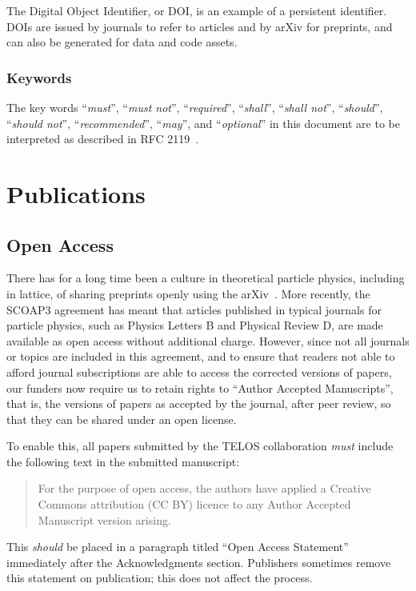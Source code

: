 \documentclass{article}
\newcommand\rfcword[1]{\emph{#1}\xspace}
\newcommand\must{\rfcword{must}}
\newcommand\mustnot{\rfcword{must not}}
\newcommand\required{\rfcword{required}}
\newcommand\shall{\rfcword{shall}}
\newcommand\shallnot{\rfcword{shall not}}
\newcommand\should{\rfcword{should}}
\newcommand\shouldnot{\rfcword{should not}}
\newcommand\recommended{\rfcword{recommended}}
\newcommand\may{\rfcword{may}}
\newcommand\optional{\rfcword{optional}}
\begin{document}
The Digital Object Identifier,
or DOI,
is an example of a persistent identifier.
DOIs are issued by journals to refer to articles
and by arXiv for preprints,
and can also be generated for data and code assets.


\subsubsection{Keywords}

The key words
``\must'',
``\mustnot'',
``\required'',
``\shall'',
``\shallnot'',
``\should'',
``\shouldnot'',
``\recommended'',
``\may'',
and ``\optional''
in this document are to be interpreted as described in RFC 2119~\cite{rfc2119}.



\section{Publications}
\label{sec:publications}

\subsection{Open Access}

There has for a long time been a culture in theoretical particle physics,
including in lattice,
of sharing preprints openly using the arXiv~\cite{ginsparg2021lessons}.
More recently,
the SCOAP3 agreement has meant that
articles published in
typical journals for particle physics,
such as Physics Letters B and Physical Review D,
are made available as open access without additional charge.
However,
since not all journals or topics are included in this agreement,
and to ensure
that readers not able to afford journal subscriptions
are able to access the corrected versions of papers,
our funders now require us to retain rights to
``Author Accepted Manuscripts'',
that is,
the versions of papers as accepted by the journal,
after peer review,
so that they can be shared under an open license.

To enable this,
all papers submitted by the TELOS collaboration
\must include the following text in the submitted manuscript:

\begin{quote}
  For the purpose of open access,
  the authors have applied a Creative Commons attribution (CC BY) licence
  to any Author Accepted Manuscript version arising.
\end{quote}

This \should be placed in a paragraph titled
``Open Access Statement''
immediately after the Acknowledgments section.
Publishers sometimes remove this statement on publication;
this does not affect the process.
\end{document}
